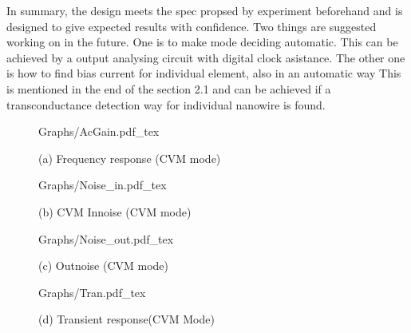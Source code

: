 \documentclass{article}
\begin{document}
In summary, the design meets the spec propsed by experiment beforehand and is designed to give expected results with confidence.
Two things are suggested working on in the future.
One is to make mode deciding automatic.
This can be achieved by a output analysing circuit with digital clock asistance.
The other one is how to find bias current for individual element, also in an automatic way
This is mentioned in the end of the section 2.1 and can be achieved if a transconductance detection way for individual nanowire is found.






\begin{figure}[!hb]
    \begin{minipage}[b]{1\linewidth}
        \centering
        \def\svgwidth{8cm}
        \fontsize{6}{8}\selectfont
         {Graphs/AcGain.pdf_tex}
        \fontsize{8}{10}\selectfont
        \centerline{(a) Frequency response (CVM mode)}\medskip
    \end{minipage}


    \begin{minipage}[!htb]{0.5\linewidth}
        \centering
        \def\svgwidth{4cm}
        \fontsize{6}{8}\selectfont
         {Graphs/Noise_in.pdf_tex}
        \fontsize{8}{10}\selectfont
        \centerline{(b) CVM Innoise (CVM mode) }\medskip
    \end{minipage}
    \hfill
    \begin{minipage}[!htb]{0.5\linewidth}
        \centering
        \def\svgwidth{5.1cm}
        \fontsize{6}{8}\selectfont
         {Graphs/Noise_out.pdf_tex}
        \fontsize{8}{10}\selectfont
        \centerline{(c) Outnoise (CVM mode) }\medskip
    \end{minipage}

    \begin{minipage}[!hb]{1\linewidth}
        \centering
        \def\svgwidth{9cm}
        \fontsize{4}{6}\selectfont
         {Graphs/Tran.pdf_tex}
        \fontsize{8}{10}\selectfont
        \centerline{(d) Transient response(CVM Mode) }\medskip
    \end{minipage}
    \caption{}
    \label{fig:res}
\end{figure}
\end{document}
